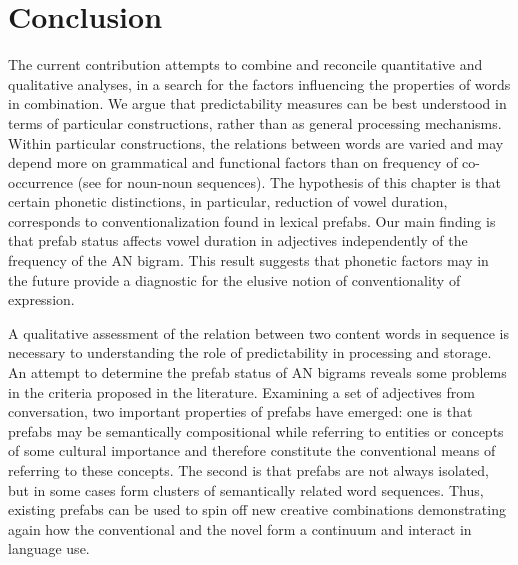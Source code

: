 \documentclass[output=paper]{langscibook}
\begin{document}
\section{Conclusion}

The current contribution attempts to combine and reconcile quantitative and qualitative analyses, in a search for the factors influencing the properties of words in combination. We argue that predictability measures can be best understood in terms of particular constructions, rather than as general processing mechanisms. Within particular constructions, the relations between words are varied and may depend more on grammatical and functional factors than on frequency of co-occurrence (see \citealt{BellPlag2012} for noun-noun sequences). The hypothesis of this chapter is that certain phonetic distinctions, in particular, reduction of vowel duration, corresponds to conventionalization found in lexical prefabs. Our main finding is that prefab status affects vowel duration in adjectives independently of the frequency of the AN bigram. This result suggests that phonetic factors may in the future provide a diagnostic for the elusive notion of conventionality of expression. 

A qualitative assessment of the relation between two content words in sequence is necessary to understanding the role of predictability in processing and storage. An attempt to determine the prefab status of AN bigrams reveals some problems in the criteria proposed in the literature. Examining a set of adjectives from conversation, two important properties of prefabs have emerged: one is that prefabs may be semantically compositional while referring to entities or concepts of some cultural importance and therefore constitute the conventional means of referring to these concepts. The second is that prefabs are not always isolated, but in some cases form clusters of semantically related word sequences. Thus, existing prefabs can be used to spin off new creative combinations demonstrating again how the conventional and the novel form a continuum and interact in language use. 

\label{sec:bybee:Appendix1}
\end{document}
